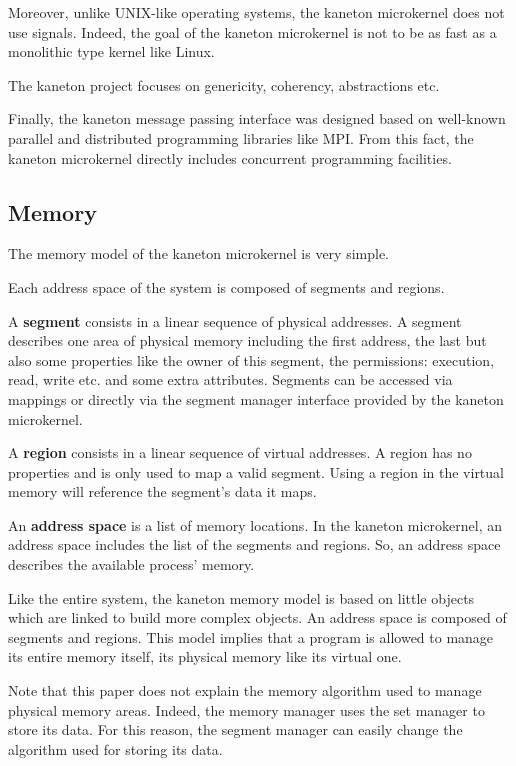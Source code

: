 \begin{multicols}{2}
Moreover, unlike UNIX-like operating systems, the kaneton microkernel does
not use signals. Indeed, the goal of the kaneton microkernel is not to
be as fast as a monolithic type kernel like Linux.

The kaneton project focuses on genericity, coherency, abstractions etc.

Finally, the kaneton message passing interface was designed based on
well-known parallel and distributed programming libraries like MPI. From
this fact, the kaneton microkernel directly includes concurrent
programming facilities.

%
%

\subsection{Memory}

The memory model of the kaneton microkernel is very simple.

Each address space of the system is composed of segments and regions.

A \textbf{segment} consists in a linear sequence of physical addresses.
A segment describes one area of physical memory including the
first address, the last but also some properties like the owner of this
segment, the permissions: execution, read, write etc. and some
extra attributes. Segments can be accessed via mappings or directly via
the segment manager interface provided by the kaneton microkernel.

A \textbf{region} consists in a linear sequence of virtual addresses.
A region has no properties and is only used to map a valid segment.
Using a region in the virtual memory will reference the segment's data
it maps.

An \textbf{address space} is a list of memory locations. In the kaneton
microkernel, an address space includes the list of the segments and regions.
So, an address space describes the available process' memory.

Like the entire system, the kaneton memory model is based on little objects
which are linked to build more complex objects. An address space is composed
of segments and regions. This model implies that a program is allowed to
manage its entire memory itself, its physical memory like its virtual one.

Note that this paper does not explain the memory algorithm used to manage
physical memory areas. Indeed, the memory manager uses the set manager
to store its data. For this reason, the segment manager can easily change
the algorithm used for storing its data.


\end{multicols}
